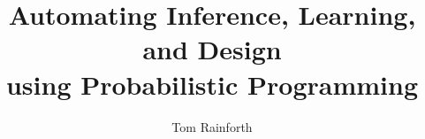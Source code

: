 
\correctionstrue

\usepackage{natbib}

\renewcommand*{\bibfont}{\small}
\setlength{\bibsep}{2pt}

\title{\vspace{20pt}Automating Inference, Learning, and Design \\ using Probabilistic Programming}
\author{Tom Rainforth}


\usepackage{microtype}

\usepackage{times}
\usepackage{graphicx} %
\usepackage{subcaption} 
\graphicspath{{./part/ipmcmc/figures/}{./misc/figures/}{./bopp/figures/}{./opt/figures/}{./design/figures/}{./nest/figures/}{./inf/figures/}{./part/figures/}{./bayes/figures/}{./probprog/figures/}{./part/figures/}}
\usepackage{tikz}
\usetikzlibrary{fit}					%
\usetikzlibrary{backgrounds}	%
\usepackage{setspace}

\usepackage{cancel}




\usepackage{amsthm}
\usepackage{dsfont}
\usepackage{amssymb,amsmath}
\usepackage{bbm}


